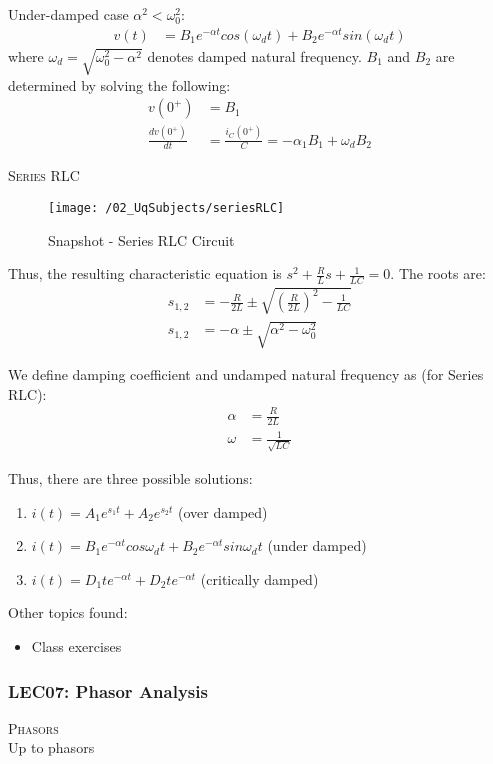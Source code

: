 Under-damped case $\alpha^2 < \omega_0^2$:
\begin{align}
  v(t) &= B_1 e^{-\alpha t} cos (\omega_d t) + B_2 e^{-\alpha t} sin (\omega_d t)
\end{align}
where $\omega_d = \sqrt{\omega_0^2 - \alpha^2}$ denotes damped natural frequency.
$B_1$ and $B_2$ are determined by solving the following:
\begin{align}
  v(0^+) &= B_1 \\
  \frac{dv(0^+)}{dt} &= \frac{i_C(0^+)}{C} = -\alpha_1 B_1 + \omega_d B_2
\end{align}

\textsc{\large Series RLC}\\
\begin{figure}
  \texttt{[image: /02\_UqSubjects/seriesRLC]}
  \caption{Snapshot - Series RLC Circuit}
  \label{fig_seriesRLC}
\end{figure}

Thus, the resulting characteristic equation is $s^2 + \frac{R}{L}s + \frac{1}{LC} = 0$. The roots are:
\begin{align}
  s_{1,2} &= -\frac{R}{2L} \pm \sqrt{(\frac{R}{2L})^2 - \frac{1}{LC}} \\
  s_{1,2} &= -\alpha \pm \sqrt{\alpha^2 - \omega_0^2}
\end{align}

We define damping coefficient and undamped natural frequency as (for Series RLC):
\begin{align}
  \alpha &= \frac{R}{2L} \\
  \omega &= \frac{1}{\sqrt{LC}}
\end{align}

Thus, there are three possible solutions:
\begin{enumerate}
  \item $i(t) = A_1e^{s_1t} + A_2e^{s_2t}$ (over damped)
  \item $i(t) = B_1e^{-\alpha t}cos{\omega_d t} + B_2e^{-\alpha t}sin{\omega_d t}$ (under damped)
  \item $i(t) = D_1 t e^{-\alpha t} + D_2 t e^{-\alpha t}$ (critically damped)
\end{enumerate}

Other topics found:
\begin{itemize}
  \item Class exercises
\end{itemize}

\subsubsection{LEC07: Phasor Analysis}
\textsc{\large Phasors}\\
Up to phasors
\clearpage

